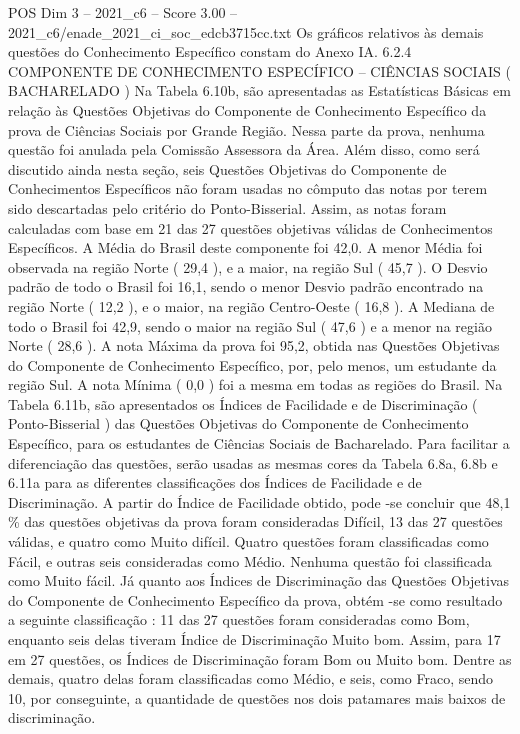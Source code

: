 \begin{textsample}{POS Dim 3 – 2021\_c6 – Score 3.00 – 2021\_c6/enade\_2021\_ci\_soc\_edcb3715cc.txt}
Os gráficos relativos às demais questões do Conhecimento Específico constam do Anexo IA. 6.2.4 COMPONENTE DE CONHECIMENTO ESPECÍFICO – CIÊNCIAS SOCIAIS ( BACHARELADO ) Na Tabela 6.10b, são apresentadas as Estatísticas Básicas em relação às Questões Objetivas do Componente de Conhecimento Específico da prova de Ciências Sociais por Grande Região.
Nessa parte da prova, nenhuma questão foi anulada pela Comissão Assessora da Área.
Além disso, como será discutido ainda nesta seção, seis Questões Objetivas do Componente de Conhecimentos Específicos não foram usadas no cômputo das notas por terem sido descartadas pelo critério do Ponto-Bisserial.
Assim, as notas foram calculadas com base em 21 das 27 questões objetivas válidas de Conhecimentos Específicos.
A Média do Brasil deste componente foi 42,0.
A menor Média foi observada na região Norte ( 29,4 ), e a maior, na região Sul ( 45,7 ).
O Desvio padrão de todo o Brasil foi 16,1, sendo o menor Desvio padrão encontrado na região Norte ( 12,2 ), e o maior, na região Centro-Oeste ( 16,8 ).
A Mediana de todo o Brasil foi 42,9, sendo o maior na região Sul ( 47,6 ) e a menor na região Norte ( 28,6 ).
A nota Máxima da prova foi 95,2, obtida nas Questões Objetivas do Componente de Conhecimento Específico, por, pelo menos, um estudante da região Sul.
A nota Mínima ( 0,0 ) foi a mesma em todas as regiões do Brasil.
Na Tabela 6.11b, são apresentados os Índices de Facilidade e de Discriminação ( Ponto-Bisserial ) das Questões Objetivas do Componente de Conhecimento Específico, para os estudantes de Ciências Sociais de Bacharelado.
Para facilitar a diferenciação das questões, serão usadas as mesmas cores da Tabela 6.8a, 6.8b e 6.11a para as diferentes classificações dos Índices de Facilidade e de Discriminação.
A partir do Índice de Facilidade obtido, pode -se concluir que 48,1 \% das questões objetivas da prova foram consideradas Difícil, 13 das 27 questões válidas, e quatro como Muito difícil.
Quatro questões foram classificadas como Fácil, e outras seis consideradas como Médio.
Nenhuma questão foi classificada como Muito fácil.
Já quanto aos Índices de Discriminação das Questões Objetivas do Componente de Conhecimento Específico da prova, obtém -se como resultado a seguinte classificação : 11 das 27 questões foram consideradas como Bom, enquanto seis delas tiveram Índice de Discriminação Muito bom.
Assim, para 17 em 27 questões, os Índices de Discriminação foram Bom ou Muito bom.
Dentre as demais, quatro delas foram classificadas como Médio, e seis, como Fraco, sendo 10, por conseguinte, a quantidade de questões nos dois patamares mais baixos de discriminação.

\end{textsample}
